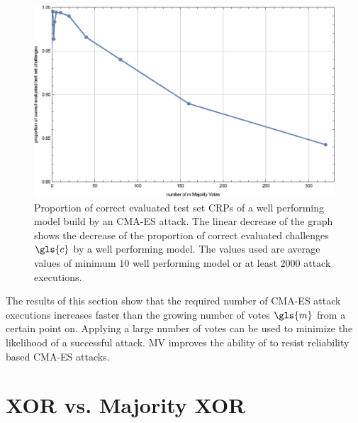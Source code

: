 \begin{figure}[ht]
\includegraphics[width=1.00\textwidth]{images/single-mv-classification-cma-attack-correctness.eps}
\caption[Proportion of correct evaluated test set challenges for Arbiter \puf models and Majority Arbiter \puf models]{Proportion of correct evaluated test set \acp{CRP} of a well performing model build by an \ac{CMA-ES} attack. The linear decrease of the graph shows the decrease of the proportion of correct evaluated challenges $\gls{c}$ by a well performing model. The values used are average values of minimum $10$ well performing model or at least $2000$ attack executions.}
\label{fig:cmasingleattackcorrectness}
\end{figure}

The results of this section show that the required number of \ac{CMA-ES} attack executions increases faster than the growing number of votes $\gls{m}$ from a certain point on.
Applying a large number of votes can be used to minimize the likelihood of a successful attack.
\ac{MV} improves the ability of \apufs to resist reliability based \ac{CMA-ES} attacks.


\section{\acs{XOR} \apufs vs. Majority \acs{XOR} \apufs}
\label{sec:xorarbitervsmajorityxorarbiter}


